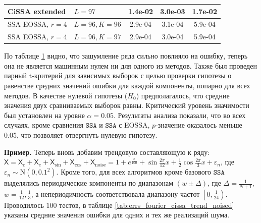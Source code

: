 \documentclass[12pt, specialist, subf
]{disser}
\theoremstyle{definition}
\newcommand{\SSA}{\texttt{SSA}}
\newcommand{\TS}{\mathsf{X}}
\begin{document}
\begin{table}[H]
\begin{tabular}{l|l|ccc}
		CiSSA extended     & $L = 97$             & 1.4e-02                          & 3.0e-03                          & 1.7e-02                   \\
		\hline
		SSA EOSSA, $r = 4$ & $L = 96, K = 96 $    & 2.9e-04                          & 3.1e-04                          & 5.9e-04                   \\
		SSA EOSSA, $r = 4$ & $L = 96, K = 97 $    & 2.9e-04                          & 3.0e-04                          & 5.9e-04                   \\
		\hline
	\end{tabular}
	\label{tab:errs_fourier_cissa_sin_cos_noised}
\end{table}



По таблице \ref{tab:errs_fourier_cissa_sin_cos_noised} видно, что зашумление ряда сильно повлияло на ошибку, теперь она не является машинным нулем ни для одного из методов. Также был проведен парный t-критерий для зависимых выборок с целью проверки гипотезы о равенстве средних значений ошибки для каждой компоненты, попарно для всех методов. В качестве нулевой гипотезы ($H_0$) предполагалось, что средние значения двух сравниваемых выборок равны. Критический уровень значимости был установлен на уровне $\alpha = 0.05$.
Результаты анализа показали, что во всех случаях, кроме сравнения $\SSA$ и $\SSA$ с EOSSA, $p$-значение оказалось меньше 0.05, что позволяет отвергнуть нулевую гипотезу.

\textbf{\large{Пример.}} Теперь вновь добавим трендовую составляющую к ряду: $\TS = \TS_{c} + \TS_e + \TS_{\sin} + \TS_{\cos} + \TS_{\mathrm{noise}} = 1 + e^{\frac{x}{100}} + \sin{\frac{2\pi}{12}x} + \frac{1}{2}\cos{\frac{2\pi}{3}x} + \varepsilon_n$, где $\varepsilon_n \sim \mathrm N(0, 0.1^2)$. Кроме того, для всех алгоритмов кроме базового $\SSA$ выделялись периодические компоненты по диапазонам $\left(w \pm \Delta \right)$, где $\Delta = \frac{1}{N+1}$, $w = \frac{1}{12}, \frac{1}{3}$, а непериодичность соответствовала диапазону частот $\left[0, \frac{1}{24} \right)$. Проводилось $100$ тестов, в таблице \ref{tab:errs_fourier_cissa_trend_noised} указаны средние значения ошибки для одних и тех же реализаций шума.
\end{document}
